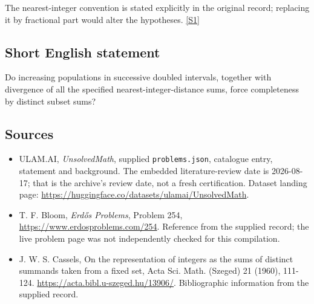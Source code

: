 \documentclass[11pt,a4paper]{article}
\newcommand{\sref}[2]{\hyperlink{source:#1:#2}{[S#2]}}
\begin{document}
The nearest-integer convention is stated explicitly in the original record; replacing it by fractional part would alter the hypotheses. \sref{statement}{1}

\subsection{Short English statement}

Do increasing populations in successive doubled intervals, together with divergence of all the specified nearest-integer-distance sums, force completeness by distinct subset sums?

\subsection{Sources}

{\small

\begin{itemize}

\item[\hypertarget{source:statement:1}{S1}] ULAM.AI, \emph{UnsolvedMath}, supplied \texttt{problems.json}, catalogue entry, statement and background. The embedded literature-review date is 2026-08-17; that is the archive’s review date, not a fresh certification. Dataset landing page: \url{https://huggingface.co/datasets/ulamai/UnsolvedMath}.

\item[\hypertarget{source:statement:2}{S2}] T. F. Bloom, \emph{Erdős Problems}, Problem 254, \url{https://www.erdosproblems.com/254}. Reference from the supplied record; the live problem page was not independently checked for this compilation.

\item[\hypertarget{source:statement:3}{S3}] J. W. S. Cassels, On the representation of integers as the sums of distinct summands taken from a fixed set, Acta Sci. Math. (Szeged) 21 (1960), 111-124. \url{https://acta.bibl.u-szeged.hu/13906/}. Bibliographic information from the supplied record.

\end{itemize}

}

\label{end:statement}
\end{document}
